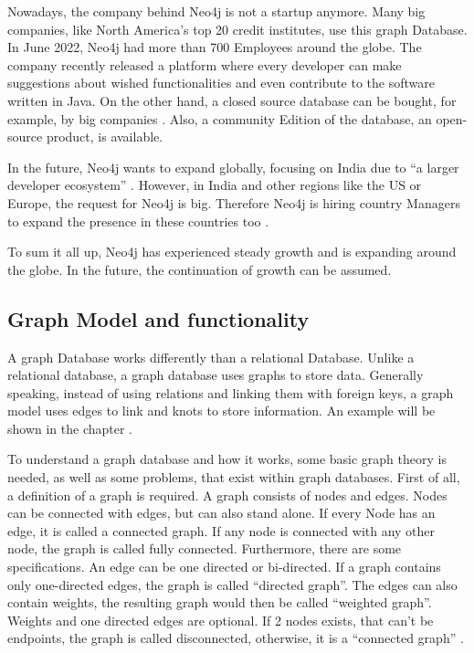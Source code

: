 Nowadays, the company behind Neo4j is not a startup anymore. Many big companies, like North America's top 20 credit institutes, use this graph Database. In June 2022, Neo4j had more than 700 Employees around the globe.
The company recently released a platform where every developer can make suggestions about wished functionalities and even contribute
to the software written in Java. On the other hand, a closed source database can be bought, for example, by big companies \parencite{historyneo4j}. Also, a community Edition of the database, an open-source product, is available.

In the future, Neo4j wants to expand globally, focusing on India due to \enquote{a larger developer ecosystem} \parencite{historyneo4j}. However, in India and other regions like the US or Europe, the request 
for Neo4j is big. Therefore Neo4j is hiring country Managers to expand the presence in these countries too \parencite{historyneo4j}.

To sum it all up, Neo4j has experienced steady growth and is expanding around the globe. In the future, the continuation of growth can be assumed.

\subsection{Graph Model and functionality} \label{subsec:graphModelFunctionalityNeo4j}

A graph Database works differently than a relational Database. Unlike a relational database, a graph database uses graphs to store data. Generally speaking, instead of using relations and linking them with foreign keys, a graph model uses edges to link and knots to store information. An example will be shown in the chapter .

To understand a graph database and how it works, some basic graph theory is needed, as well as some problems, that exist within graph databases. First of all, a definition of a graph is required. A graph consists of nodes and edges. Nodes can be connected with edges, but can also stand alone. If every Node has an edge, it is called a connected graph. If any node is connected with any other node, the graph is called fully connected.
Furthermore, there are some specifications. An edge can be one directed or bi-directed. If a graph contains only one-directed edges, the graph is called \enquote{directed graph}. The edges can also contain weights, the resulting graph would then be called \enquote{weighted graph}. Weights and one directed edges are optional. If 2 nodes exists, that can't be endpoints, the graph is called disconnected, otherwise, it is a \enquote{connected graph} \parencite{graphBasics}.


